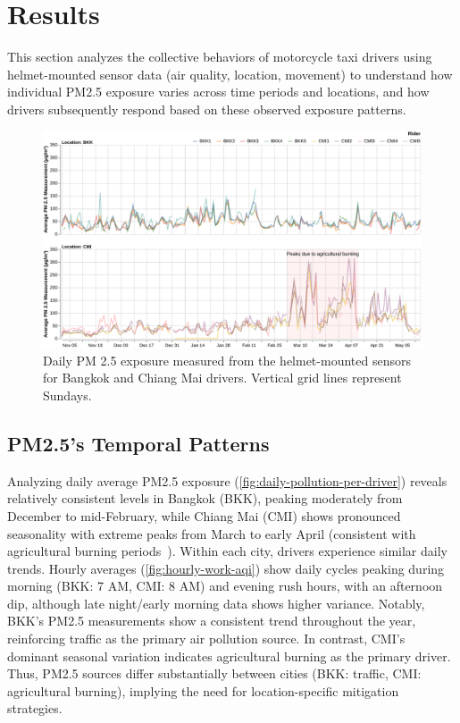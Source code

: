 \section{Results}

This section analyzes the collective behaviors of motorcycle taxi drivers using helmet-mounted sensor data (air quality, location, movement) to understand how individual PM2.5 exposure varies across time periods and locations, and how drivers subsequently respond based on these observed exposure patterns.

\begin{figure}
    \centering
    \includegraphics[width=\textwidth]{figures/daily-pollution-per-rider.pdf}
    \caption{
    Daily PM 2.5 exposure measured from the helmet-mounted sensors for Bangkok and Chiang Mai drivers.
    Vertical grid lines represent Sundays.
    }
    \Description{}
    \label{fig:daily-pollution-per-driver}
\end{figure}

\subsection{PM2.5's Temporal Patterns}
Analyzing daily average PM2.5 exposure (\autoref{fig:daily-pollution-per-driver}) reveals relatively consistent levels in Bangkok (BKK), peaking moderately from December to mid-February,
while Chiang Mai (CMI) shows pronounced seasonality with extreme peaks from March to early April (consistent with agricultural burning periods~\cite{david2025chiangmaiburn, bernsten2024chiangmaiburn, iqair2023chiangmaiburn}).
Within each city, drivers experience similar daily trends.
Hourly averages (\autoref{fig:hourly-work-aqi}) show daily cycles peaking during morning (BKK: 7 AM, CMI: 8 AM) and evening rush hours, with an afternoon dip, although late night/early morning data shows higher variance.
Notably, BKK's PM2.5 measurements show a consistent trend throughout the year, reinforcing traffic as the primary air pollution source.
In contrast, CMI's dominant seasonal variation indicates agricultural burning as the primary driver.
Thus, PM2.5 sources differ substantially between cities (BKK: traffic, CMI: agricultural burning), implying the need for location-specific mitigation strategies.



